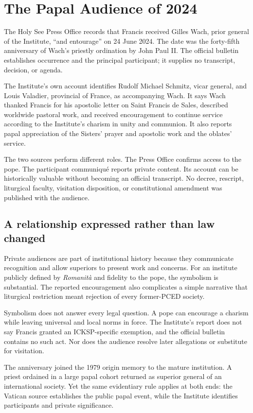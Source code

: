\section{The Papal Audience of 2024}

The Holy See Press Office records that Francis received Gilles Wach, prior general of the Institute, ``and entourage'' on 24 June 2024. The date was the forty-fifth anniversary of Wach's priestly ordination by John Paul II. The official bulletin establishes occurrence and the principal participant; it supplies no transcript, decision, or agenda.

The Institute's own account identifies Rudolf Michael Schmitz, vicar general, and Louis Valadier, provincial of France, as accompanying Wach. It says Wach thanked Francis for his apostolic letter on Saint Francis de Sales, described worldwide pastoral work, and received encouragement to continue service according to the Institute's charism in unity and communion. It also reports papal appreciation of the Sisters' prayer and apostolic work and the oblates' service.

The two sources perform different roles. The Press Office confirms access to the pope. The participant communiqué reports private content. Its account can be historically valuable without becoming an official transcript. No decree, rescript, liturgical faculty, visitation disposition, or constitutional amendment was published with the audience.

\subsection{A relationship expressed rather than law changed}

Private audiences are part of institutional history because they communicate recognition and allow superiors to present work and concerns. For an institute publicly defined by \emph{Romanità} and fidelity to the pope, the symbolism is substantial. The reported encouragement also complicates a simple narrative that liturgical restriction meant rejection of every former-PCED society.

Symbolism does not answer every legal question. A pope can encourage a charism while leaving universal and local norms in force. The Institute's report does not say Francis granted an ICKSP-specific exemption, and the official bulletin contains no such act. Nor does the audience resolve later allegations or substitute for visitation.

The anniversary joined the 1979 origin memory to the mature institution. A priest ordained in a large papal cohort returned as superior general of an international society. Yet the same evidentiary rule applies at both ends: the Vatican source establishes the public papal event, while the Institute identifies participants and private significance.

